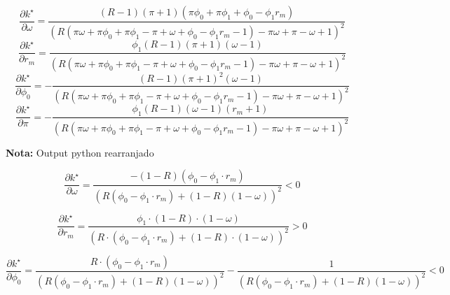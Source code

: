 \documentclass[11pt]{article}
\begin{document}
\begin{equation}\frac{\partial k^{\star}}{\partial \omega} = \frac{\left(R - 1\right) \left(\pi + 1\right) \left(\pi \phi_{0} + \pi \phi_{1} + \phi_{0} - \phi_{1} r_{m}\right)}{\left(R \left(\pi \omega + \pi \phi_{0} + \pi \phi_{1} - \pi + \omega + \phi_{0} - \phi_{1} r_{m} - 1\right) - \pi \omega + \pi - \omega + 1\right)^{2}}\end{equation}
\begin{equation}\frac{\partial k^{\star}}{\partial r_{m}} = \frac{\phi_{1} \left(R - 1\right) \left(\pi + 1\right) \left(\omega - 1\right)}{\left(R \left(\pi \omega + \pi \phi_{0} + \pi \phi_{1} - \pi + \omega + \phi_{0} - \phi_{1} r_{m} - 1\right) - \pi \omega + \pi - \omega + 1\right)^{2}}\end{equation}
\begin{equation}\frac{\partial k^{\star}}{\partial \phi_{0}} = - \frac{\left(R - 1\right) \left(\pi + 1\right)^{2} \left(\omega - 1\right)}{\left(R \left(\pi \omega + \pi \phi_{0} + \pi \phi_{1} - \pi + \omega + \phi_{0} - \phi_{1} r_{m} - 1\right) - \pi \omega + \pi - \omega + 1\right)^{2}}\end{equation}
\begin{equation}\frac{\partial k^{\star}}{\partial \pi} = - \frac{\phi_{1} \left(R - 1\right) \left(\omega - 1\right) \left(r_{m} + 1\right)}{\left(R \left(\pi \omega + \pi \phi_{0} + \pi \phi_{1} - \pi + \omega + \phi_{0} - \phi_{1} r_{m} - 1\right) - \pi \omega + \pi - \omega + 1\right)^{2}}\end{equation}


\textbf{Nota:} Output python rearranjado

\begin{equation}
\frac{\partial k^{\star}}{\partial \omega} = \frac{-(1-R)(\phi_0 - \phi_1\cdot r_m)}{(R(\phi_0 - \phi_1\cdot r_m) + (1-R)(1-\omega))^2} < 0
\end{equation}

\begin{equation}
\frac{\partial k^{\star}}{\partial r_{m}} = \frac{\phi_1\cdot(1-R)\cdot(1-\omega)}{(R\cdot (\phi_0 - \phi_1\cdot r_m) + (1-R)\cdot (1-\omega))^2} > 0
\end{equation}

\begin{equation}
\frac{\partial k^{\star}}{\partial \phi_0} = 
 \frac{R\cdot(\phi_0 - \phi_1\cdot r_m)}{(R(\phi_0 - \phi_1\cdot r_m) + (1-R)(1-\omega))^2} - \frac{1}{(R(\phi_0 - \phi_1\cdot r_m) + (1-R)(1-\omega))^2} < 0
\end{equation}
\end{document}
